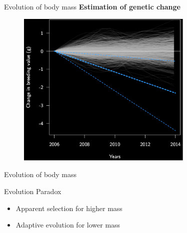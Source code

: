\documentclass[10pt]{beamer}%
\begin{document}
\begin{frame}{Evolution of body mass}
\alert{\textbf{Estimation of genetic change}}

\vspace{-0.2cm}

	\begin{figure}
		\includegraphics[width=0.75\textwidth]{Figures/DriftComp-1}
	\end{figure}
\end{frame}
%
\begin{frame}{Evolution of body mass}
\begin{alertblock}{Evolution Paradox}
	\begin{itemize}
		\item Apparent selection for higher mass
		\item Adaptive evolution for lower mass
	\end{itemize}
\end{alertblock}

	
\end{frame}
\end{document}
